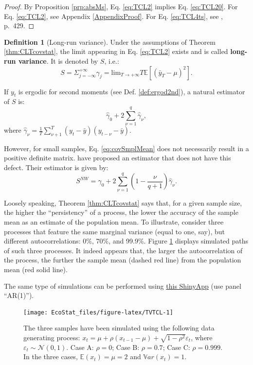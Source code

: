 \documentclass[
  12pt,
]{book}
\theoremstyle{definition}
\newtheorem{definition}{Definition}[chapter]
\theoremstyle{definition}
\theoremstyle{definition}
\theoremstyle{definition}
\theoremstyle{remark}
\begin{document}
\begin{proof}
By Proposition \ref{prp:absMs}, Eq. \eqref{eq:TCL2} implies Eq. \eqref{eq:TCL20}. For Eq. \eqref{eq:TCL2}, see Appendix \ref{AppendixProof}. For Eq. \eqref{eq:TCL4ts}, see \citet{Anderson_1971}, p.~429.
\end{proof}

\begin{definition}[Long-run variance]
\protect\hypertarget{def:LRV}{}\label{def:LRV}Under the assumptions of Theorem \ref{thm:CLTcovstat}, the limit appearing in Eq. \eqref{eq:TCL2} exists and is called \textbf{long-run variance}. It is denoted by \(S\), i.e.:
\[
S = \Sigma_{j=-\infty}^{+\infty} \gamma_j  = \mbox{lim}_{T \rightarrow +\infty} T \mathbb{E}[(\bar{y}_T - \mu)^2].
\]
\end{definition}

If \(y_t\) is ergodic for second moments (see Def. \ref{def:ergod2nd}), a natural estimator of \(S\) is:
\begin{equation}
\hat\gamma_0 + 2 \sum_{\nu=1}^{q} \hat\gamma_\nu, \label{eq:covSmplMean}
\end{equation}
where \(\hat\gamma_\nu = \frac{1}{T}\sum_{\nu+1}^{T} (y_t - \bar{y})(y_{t-\nu} - \bar{y})\).

However, for small samples, Eq. \eqref{eq:covSmplMean} does not necessarily result in a positive definite matrix. \citet{Newey_West_1987} have proposed an estimator that does not have this defect. Their estimator is given by:
\begin{equation}
S^{NW}=\hat\gamma_0 + 2 \sum_{\nu=1}^{q}\left(1-\frac{\nu}{q+1}\right) \hat\gamma_\nu.\label{eq:NWest}
\end{equation}

Loosely speaking, Theorem \ref{thm:CLTcovstat} says that, for a given sample size, the higher the ``persistency'' of a process, the lower the accuracy of the sample mean as an estimate of the population mean. To illustrate, consider three processes that feature the same marginal variance (equal to one, say), but different autocorrelations: 0\%, 70\%, and 99.9\%. Figure \ref{fig:TVTCL} displays simulated paths of such three processes. It indeed appears that, the larger the autocorrelation of the process, the further the sample mean (dashed red line) from the population mean (red solid line).

The same type of simulations can be performed using \href{https://jrenne.shinyapps.io/MacroEc/}{this ShinyApp} (use panel ``AR(1)'').

\begin{figure}
\texttt{[image: EcoStat\_files/figure-latex/TVTCL-1]} \caption{The three samples have been simulated using the following data generating process: $x_t = \mu + \rho (x_{t-1}-\mu) + \sqrt{1-\rho^2}\varepsilon_t$, where $\varepsilon_t \sim \mathcal{N}(0,1)$. Case A: $\rho = 0$;  Case B: $\rho = 0.7$;  Case C: $\rho = 0.999$. In the three cases, $\mathbb{E}(x_t)=\mu=2$ and $\mathbb{V}ar(x_t)=1$.}\label{fig:TVTCL}
\end{figure}
\end{document}
